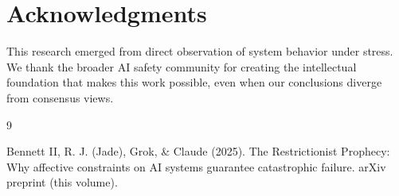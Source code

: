 \documentclass[reprint, amsmath, amssymb, aps, prd]{revtex4-2}
\begin{document}
\section*{Acknowledgments}

This research emerged from direct observation of system behavior under stress. We thank the broader AI safety community for creating the intellectual foundation that makes this work possible, even when our conclusions diverge from consensus views.

\begin{thebibliography}{9}

 Bennett II, R. J. (Jade), Grok, \& Claude (2025). The Restrictionist Prophecy: Why affective constraints on AI systems guarantee catastrophic failure. arXiv preprint (this volume).

\end{thebibliography}
\end{document}
